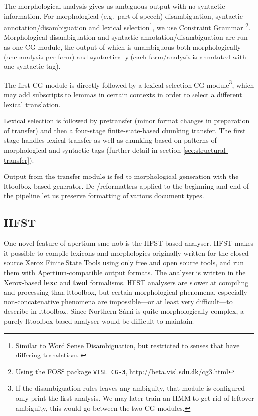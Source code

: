 The morphological analysis gives us ambiguous output with no syntactic
information. For morphological (e.g.~part-of-speech) disambiguation,
syntactic annotation/disambiguation and lexical
selection\footnote{Similar to Word Sense Disambiguation, but
  restricted to senses that have differing translations.}, we use
Constraint Grammar \citep{karlsson1990cgf}\footnote{Using the FOSS
  package {\tt \small VISL CG-3},
  \href{http://beta.visl.sdu.dk/cg3.html}{http://beta.visl.sdu.dk/cg3.html}}.
Morphological disambiguation and syntactic annotation/disambiguation
are run as one CG module, the output of which is unambiguous both
morphologically (one analysis per form) and syntactically (each
form/analysis is annotated with one syntactic tag).

The first CG module is directly followed by a lexical selection CG
module\footnote{If the disambiguation rules leaves any ambiguity, that
  module is configured only print the first analysis. We may later
  train an HMM to get rid of leftover ambiguity, this would go between
  the two CG modules.}, which may add subscripts to lemmas in certain
contexts in order to select a different lexical translation. 

Lexical selection is followed by pretransfer (minor format changes in
preparation of transfer) and then a four-stage finite-state-based
chunking transfer. The first stage handles lexical transfer as well as
chunking based on patterns of morphological and syntactic tags
(further detail in section \ref{sec:structural-transfer}).

Output from the transfer module is fed to morphological generation
with the lttoolbox-based \nob{} generator. De-/reformatters applied to
the beginning and end of the pipeline let us preserve formatting of
various document types.

\subsection{HFST}
\label{sec:hfst}
One novel feature of apertium-sme-nob is the HFST-based analyser. HFST
makes it possible to compile lexicons and morphologies originally
written for the closed-source Xerox Finite State Tools using only free
and open source tools, and run them with Apertium-compatible output
formats. The \sme{} analyser is written in the Xerox-based
\textbf{lexc} and \textbf{twol} formalisms. HFST analysers are slower
at compiling and processing than lttoolbox, but certain morphological
phenomena, especially non-concatenative phenomena  are impossible---or at least very
difficult---to describe in lttoolbox. Since Northern Sámi is quite
morphologically complex, a purely lttoolbox-based analyser would be
difficult to maintain.

